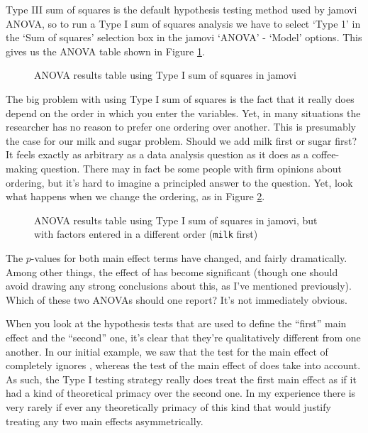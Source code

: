 Type III sum of squares is the default hypothesis testing method used by jamovi ANOVA, so to run a Type I sum of squares analysis we have to select `Type 1' in the `Sum of squares' selection box in the jamovi `ANOVA' - `Model' options. This gives us the ANOVA table shown in Figure \ref{fig:factorialanova16}.


\begin{figure}[!htb]
\begin{center}
\caption{ANOVA results table using Type I sum of squares in jamovi}
\label{fig:factorialanova16}
\HR
\end{center}
\end{figure}

The big problem with using Type I sum of squares is the fact that it really does depend on the order in which you enter the variables. Yet, in many situations the researcher has no reason to prefer one ordering over another. This is presumably the case for our milk and sugar problem. Should we add milk first or sugar first? It feels exactly as arbitrary as a data analysis question as it does as a coffee-making question. There may in fact be some people with firm opinions about ordering, but it's hard to imagine a principled answer to the question. Yet, look what happens when we change the ordering, as in Figure \ref{fig:factorialanova17}.

\begin{figure}[!htb]
\begin{center}
\caption{ANOVA results table using Type I sum of squares in jamovi, but with factors entered in a different order (\texttt{milk} first)}
\label{fig:factorialanova17}
\HR
\end{center}
\end{figure}

The $p$-values for both main effect terms have changed, and fairly dramatically. Among other things, the effect of  has become significant (though one should avoid drawing any strong conclusions about this, as I've mentioned previously). Which of these two ANOVAs should one report? It's not immediately obvious. 

When you look at the hypothesis tests that are used to define the ``first'' main effect and the ``second'' one, it's clear that they're qualitatively different from one another. In our initial example, we saw that the test for the main effect of  completely ignores , whereas the test of the main effect of  does take  into account. As such, the Type I testing strategy really does treat the first main effect as if it had a kind of theoretical primacy over the second one. In my experience there is very rarely if ever any theoretically primacy of this kind that would justify treating any two main effects asymmetrically. 

